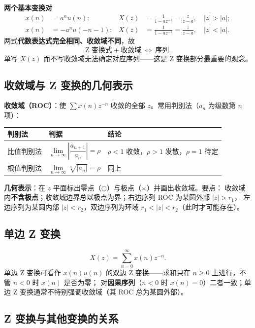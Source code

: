 \textbf{两个基本变换对}
\begin{align}
x(n)&=a^n u(n): & X(z)&=\frac{1}{1-az^{-1}}=\frac{z}{z-a},\quad |z|>|a|;\\
x(n)&=-a^n u(-n-1): & X(z)&=\frac{1}{1-az^{-1}}=\frac{z}{z-a},\quad |z|<|a|.
\end{align}
两式\textbf{代数表达式完全相同、收敛域不同}，故
\begin{equation}
\text{Z 变换式}+\text{收敛域}\ \Longleftrightarrow\ \text{序列}.
\end{equation}
单写 $X(z)$ 而不写收敛域无法确定对应序列——这是 Z 变换部分最重要的观念。

\subsection{收敛域与 Z 变换的几何表示}

\textbf{收敛域（ROC）}：使 $\sum x(n)z^{-n}$ 收敛的全部 $z$。常用判别法（$a_n$ 为级数第 $n$ 项）：

\begin{center}
\begin{tabular}{lll}
\toprule
判别法 & 判据 & 结论 \\
\midrule
比值判别法 & $\lim\limits_{n\to\infty}\left|\dfrac{a_{n+1}}{a_n}\right|=\rho$ & $\rho<1$ 收敛，$\rho>1$ 发散，$\rho=1$ 待定 \\
根值判别法 & $\lim\limits_{n\to\infty}\sqrt[n]{|a_n|}=\rho$ & 同上 \\
\bottomrule
\end{tabular}
\end{center}

\textbf{几何表示}：在 $z$ 平面标出零点（$\bigcirc$）与极点（$\times$）并画出收敛域。要点：
收敛域内\textbf{不含极点}；收敛域边界总以极点为界；右边序列 ROC 为某圆外部 $|z|>r_1$，
左边序列为某圆内部 $|z|<r_2$，双边序列为环域 $r_1<|z|<r_2$（此时才可能存在）。

\subsection{单边 Z 变换}

\begin{equation}
X(z)=\sum_{n=0}^{\infty}x(n)z^{-n}.
\end{equation}
单边 Z 变换可看作 $x(n)u(n)$ 的双边 Z 变换——求和只在 $n\ge0$ 上进行，不管 $n<0$ 时 $x(n)$ 是否为零；
对\textbf{因果序列}（$n<0$ 时 $x(n)=0$）二者一致；单边 Z 变换通常不特别强调收敛域（其 ROC 总为某圆外部）。

\subsection{Z 变换与其他变换的关系}

